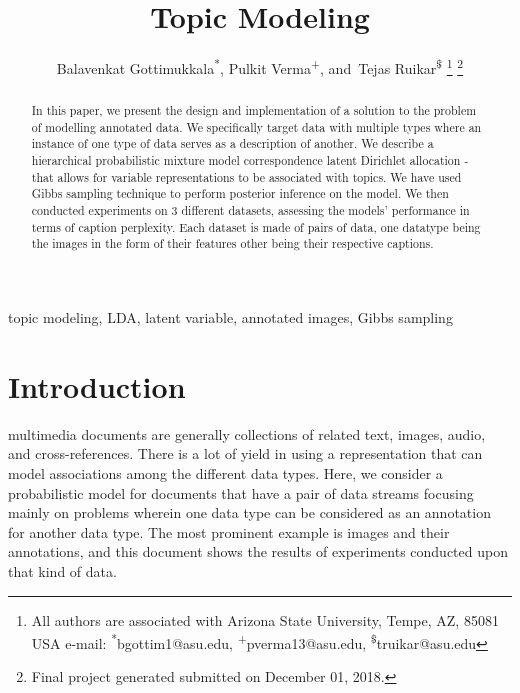 \documentclass[journal]{IEEEtran}
\begin{document}
\title{Topic Modeling}

\author{Balavenkat Gottimukkala\textsuperscript{*}, 
        Pulkit Verma\textsuperscript{+},
        and~Tejas Ruikar\textsuperscript{\$}%
\thanks{All authors are associated with Arizona State University, Tempe,
AZ, 85081 USA e-mail: \textsuperscript{*}bgottim1@asu.edu, \textsuperscript{+}pverma13@asu.edu, \textsuperscript{\$}truikar@asu.edu}%
\thanks{Final project generated submitted on December 01, 2018.}}

\maketitle

\begin{abstract}
In this paper, we present the design and implementation of a solution to the problem of modelling annotated data. We specifically target data with multiple types where an instance of one type of data serves as a description of another. We describe a hierarchical probabilistic mixture model correspondence latent Dirichlet allocation - that allows for variable representations to be associated with topics.  We have used Gibbs sampling technique to perform posterior inference on the model. We then conducted experiments on 3 different datasets, assessing the models' performance in terms of caption perplexity. Each dataset is made of pairs of data, one datatype being the images in the form of their features other being their respective captions.
\end{abstract}

\begin{IEEEkeywords}
topic modeling, LDA, latent variable, annotated images, Gibbs sampling
\end{IEEEkeywords}
\IEEEpeerreviewmaketitle

\section{Introduction}
 multimedia documents are generally collections of related text, images, audio, and cross-references. There is a lot of yield in using a representation that can model associations among the different data types. Here, we consider a probabilistic model for documents that have a pair of data streams focusing mainly on problems wherein one data type can be considered as an annotation for another data type. The most prominent example is images and their annotations, and this document shows the results of experiments conducted upon that kind of data.
\end{document}
